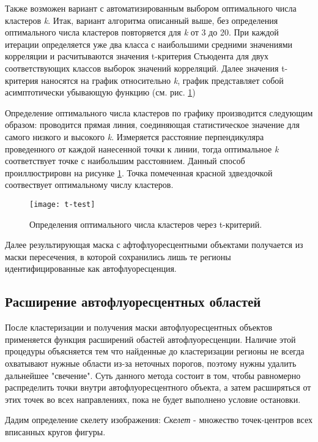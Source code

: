 Также возможен вариант с автоматизированным выбором оптимального числа кластеров \textit{k}. Итак, вариант алгоритма описанный выше, без определения оптимального числа кластеров повторяется для \textit{k} от 3 до 20. При каждой итерации определяется уже два класса с наибольшими средними значениями корреляции и расчитываются значения t-критерия Стьюдента для двух соответствующих классов выборок значений корреляций. Далее значения t-критерия наносятся на график относительно \textit{k}, график представляет собой асимптотически убывающую функцию (см. рис. \ref{t-test})

Определение оптимального числа кластеров по графику производится следующим образом: проводится
прямая линия, соединяющая статистическое значение для самого низкого и высокого \textit{k}. Измеряется  расстояние перпендикуляра проведенного от каждой нанесенной точки к линии, тогда оптимальное \textit{k} соответствует точке с наибольшим расстоянием. Данный способ проиллюстрировн на рисунке \ref{t-test}. Точка помеченная красной здвездочкой соотвествует оптимальному числу кластеров.\cite{Conference}

\begin{figure}[H]
	\centering
	\texttt{[image: t-test]}
	\caption{Определения оптимального числа кластеров через t-критерий.}
	\label{t-test}
\end{figure}
	
	
Далее результирующая маска с афтофлуоресцентными объектами получается из маски пересечения, в которой сохранились лишь те регионы идентифицированные как автофлуоресценция.

	
	
	
	
	
\subsection{Расширение автофлуоресцентных областей}
После кластеризации и получения маски автофлуоресцентных объектов применяется функция расширений обастей автофлуоресценции. Наличие этой процедуры объясняется тем что найденные до кластеризации регионы не всегда охватывают нужные области из-за неточных порогов, поэтому нужны удалить дальнейшее "свечение". Суть данного метода состоит в том, чтобы равномерно распределить точки внутри автофлуоресцентного
объекта, а затем расширяться от этих точек во всех направлениях, пока не будет выполнено условие
остановки.

Дадим определение скелету изображения: \textit{Скелет} - множество точек-центров всех вписанных кругов фигуры.

